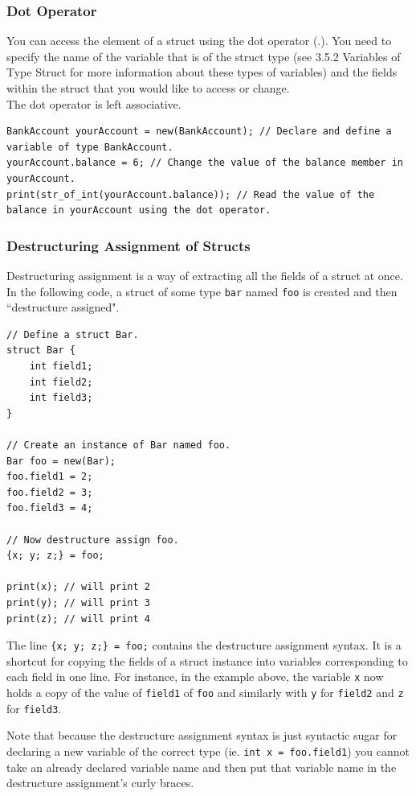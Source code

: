 \documentclass[12pt]{article}
\begin{document}
\subsubsection{Dot Operator}
You can access the element of a struct using the dot operator ($.$). You need to specify the name of the variable that is of the struct type (see 3.5.2 Variables of Type Struct for more information about these types of variables) and the fields within the struct that you would like to access or change. \\

The dot operator is left associative. 
\begin{lstlisting}
BankAccount yourAccount = new(BankAccount); // Declare and define a variable of type BankAccount.
yourAccount.balance = 6; // Change the value of the balance member in yourAccount.
print(str_of_int(yourAccount.balance)); // Read the value of the balance in yourAccount using the dot operator.
\end{lstlisting}

\subsubsection{Destructuring Assignment of Structs}
Destructuring assignment is a way of extracting all the fields of a struct at once. In the following code, a struct of some type \lstinline!bar! named \lstinline!foo! is created and then ``destructure assigned".
\begin{lstlisting}
// Define a struct Bar.
struct Bar {
    int field1;
    int field2;
    int field3;
}

// Create an instance of Bar named foo.
Bar foo = new(Bar);
foo.field1 = 2;
foo.field2 = 3;
foo.field3 = 4;

// Now destructure assign foo.
{x; y; z;} = foo;

print(x); // will print 2
print(y); // will print 3
print(z); // will print 4
\end{lstlisting}
The line \lstinline!{x; y; z;} = foo;! contains the destructure assignment syntax. It is a shortcut for copying the fields of a struct instance into variables corresponding to each field in one line. For instance, in the example above, the variable \lstinline!x! now holds a copy of the value of \lstinline!field1! of \lstinline!foo! and similarly with \lstinline!y! for \lstinline!field2! and \lstinline!z! for \lstinline!field3!. 

Note that because the destructure assignment syntax is just syntactic sugar for declaring a new variable of the correct type (ie. \lstinline!int x = foo.field1!) you cannot take an already declared variable name and then put that variable name in the destructure assignment's curly braces.
\end{document}
